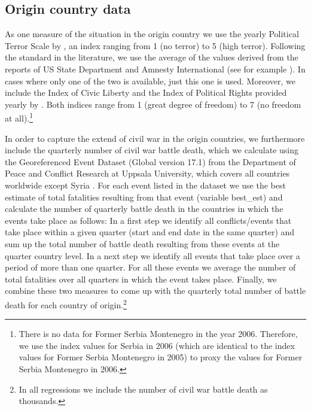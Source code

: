 \documentclass[11pt,a4paper]{scrartcl}
\begin{document}
\subsection{Origin country data}

As one measure of the situation in the origin country we use the yearly Political Terror Scale by \textcite{PTS2017}, an index ranging from 1 (no terror) to 5 (high terror). Following the standard in the literature, we use the average of the values derived from the reports of US State Department and Amnesty International (see for example \textcite{hatton2017}). In cases where only one of the two is available, just this one is used. 
Moreover, we include the Index of Civic Liberty and the Index of Political Rights provided yearly by  \textcite{FHI2017}. Both indices range from 1 (great degree of freedom) to 7 (no freedom at all).\footnote{There is no data for Former Serbia Montenegro in the year 2006. Therefore, we use the index values for Serbia in 2006 (which are identical to the index values for Former Serbia Montenegro in 2005) to proxy the values for Former Serbia Montenegro in 2006.}

In order to capture the extend of civil war in the origin countries, we furthermore include the quarterly number of civil war battle death, which we calculate using the Georeferenced Event Dataset (Global version 17.1) from the Department of Peace and Conflict Research at Uppsala University, which covers all countries worldwide except Syria \parencites{Uppsala2013, Uppsala2017}. For each event listed in the dataset we use the best estimate of total fatalities resulting from that event (variable best\_est) and calculate the number of quarterly battle death in the countries in which the events take place as follows: In a first step we identify all conflicts/events that take place within a given quarter (start and end date in the same quarter) and sum up the total number of battle death resulting from these events at the quarter country level. In a next step we identify all events that take place over a period of more than one quarter. For all these events we average the number of total fatalities over all quarters in which the event takes place. Finally, we combine these two measures to come up with the quarterly total number of battle death for each country of origin.\footnote{In all regressions we include the number of civil war battle death as thousands.}
\end{document}
